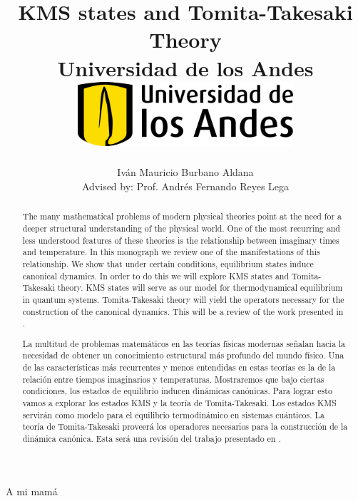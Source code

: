 \documentclass[12pt]{report}
\title 
{
	{KMS states and Tomita-Takesaki Theory}\\
	{\large Universidad de los Andes}\\
	\vspace{1.5cm}
	{\includegraphics[width = 0.6\textwidth]{logo.png}}	
}
\author{Iván Mauricio Burbano Aldana\\[1cm]{\small Advised by: Prof. Andrés Fernando Reyes Lega}}
\newenvironment{dedication}
  {\clearpage           %
   \thispagestyle{empty}%
   \vspace*{\stretch{1}}%
   \raggedleft          %
  }
  {\par %
   \vspace{\stretch{3}} %
   \clearpage           %
  }
\theoremstyle{definition}
\begin{document}

\maketitle

\begin{dedication}
{\LARGE\calligra A mi mamá}
\end{dedication}

\begin{abstract}

The many mathematical problems of modern physical theories point at the need for a deeper structural understanding of the physical world. One of the most recurring and less understood features of these theories is the relationship between imaginary times and temperature. In this monograph we review one of the manifestations of this relationship. We show that under certain conditions, equilibrium states induce canonical dynamics. In order to do this we will explore KMS states and Tomita-Takesaki theory. KMS states will serve as our model for thermodynamical equilibrium in quantum systems. Tomita-Takesaki theory will yield the operators necessary for the construction of the canonical dynamics. This will be a review of the work presented in \cite{Duvenhage1999}.

\end{abstract}

\begin{otherlanguage}{spanish}
\begin{abstract}

La multitud de problemas matemáticos en las teorías físicas modernas señalan hacia la necesidad de obtener un conocimiento estructural más profundo del mundo físico. Una de las características más recurrentes y menos entendidas en estas teorías es la de la relación entre tiempos imaginarios y temperaturas. Mostraremos que bajo ciertas condiciones, los estados de equilibrio inducen dinámicas canónicas. Para lograr esto vamos a explorar los estados KMS y la teoría de Tomita-Takesaki. Los estados KMS servirán como modelo para el equilibrio termodinámico en sistemas cuánticos. La teoría de Tomita-Takesaki proveerá los operadores necesarios para la construcción de la dinámica canónica. Esta será una revisión del trabajo presentado en \cite{Duvenhage1999}.

\end{abstract}
\end{otherlanguage}

\newpage
\end{document}
